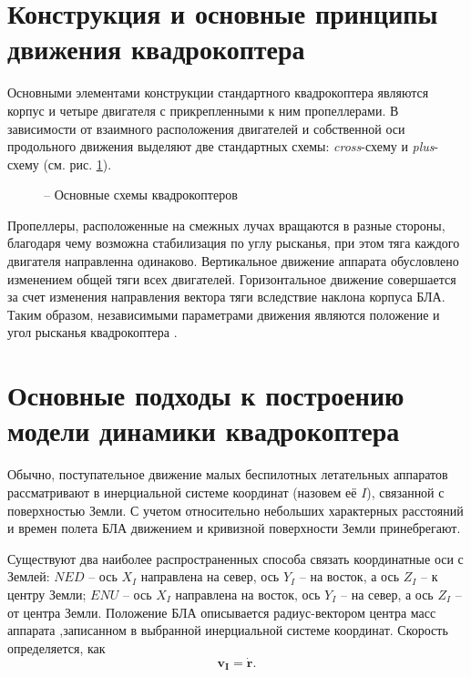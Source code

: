\section{Конструкция и основные принципы движения квадрокоптера}

Основными элементами конструкции стандартного квадрокоптера являются корпус и четыре двигателя с прикрепленными к ним пропеллерами. В зависимости от взаимного расположения двигателей и собственной оси продольного движения выделяют две стандартных схемы: \textit{cross}-схему и \textit{plus}-схему \cite{Bashi01} (см. рис. \ref{fig:cross_plus}).
\begin{figure}[h!]
	\centering
	\quad
	\caption{ -- Основные схемы квадрокоптеров}
	\label{fig:cross_plus}
\end{figure}
Пропеллеры, расположенные на смежных лучах вращаются в разные стороны, благодаря чему возможна стабилизация по углу рысканья, при этом тяга каждого двигателя направленна одинаково. Вертикальное движение аппарата обусловлено изменением общей тяги всех двигателей. Горизонтальное движение совершается за счет изменения направления вектора тяги вследствие наклона корпуса БЛА. Таким образом, независимыми параметрами движения являются положение и угол рысканья квадрокоптера \cite{Salih01}. 

\section{Основные подходы к построению модели динамики квадрокоптера}
	
Обычно, поступательное движение малых беспилотных летательных аппаратов рассматривают в инерциальной системе координат (назовем её {$I$}), связанной с поверхностью Земли. С учетом относительно небольших характерных расстояний и времен полета БЛА движением и кривизной поверхности Земли принебрегают.

Существуют два наиболее распространенных способа связать координатные оси с Землей: {$NED$} --  ось \textbf{$X_I$} направлена на север, ось \textbf{$Y_I$} -- на восток, а ось \textbf{$Z_I$} -- к центру Земли; {$ENU$} -- ось \textbf{$X_I$} направлена на восток, ось \textbf{$Y_I$} -- на север, а ось \textbf{$Z_I$} -- от центра Земли. Положение БЛА описывается радиус-вектором центра масс аппарата ,записанном в выбранной инерциальной системе координат. Скорость определяется, как
\begin{equation} \label{eq:velocity}
\bm{v_I} = \dot{\bm{r}}.
\end{equation}

